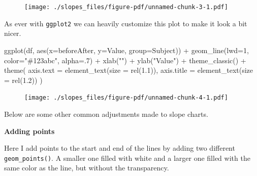 \documentclass[
  letterpaper,
  DIV=11,
  numbers=noendperiod]{scrreprt}
\newenvironment{Shaded}{\begin{snugshade}}{\end{snugshade}}
\newcommand{\AttributeTok}[1]{\textcolor[rgb]{0.40,0.45,0.13}{#1}}
\newcommand{\DecValTok}[1]{\textcolor[rgb]{0.68,0.00,0.00}{#1}}
\newcommand{\FloatTok}[1]{\textcolor[rgb]{0.68,0.00,0.00}{#1}}
\newcommand{\FunctionTok}[1]{\textcolor[rgb]{0.28,0.35,0.67}{#1}}
\newcommand{\NormalTok}[1]{\textcolor[rgb]{0.00,0.23,0.31}{#1}}
\newcommand{\SpecialCharTok}[1]{\textcolor[rgb]{0.37,0.37,0.37}{#1}}
\newcommand{\StringTok}[1]{\textcolor[rgb]{0.13,0.47,0.30}{#1}}
\begin{document}
\begin{figure}[H]

{\centering \texttt{[image: ./slopes\_files/figure-pdf/unnamed-chunk-3-1.pdf]}

}

\end{figure}

As ever with \texttt{ggplot2} we can heavily customize this plot to make
it look a bit nicer.

\begin{Shaded}
\begin{Highlighting}[]
\FunctionTok{ggplot}\NormalTok{(df, }\FunctionTok{aes}\NormalTok{(}\AttributeTok{x=}\NormalTok{beforeAfter, }\AttributeTok{y=}\NormalTok{Value, }\AttributeTok{group=}\NormalTok{Subject)) }\SpecialCharTok{+}
  \FunctionTok{geom\_line}\NormalTok{(}\AttributeTok{lwd=}\DecValTok{1}\NormalTok{, }\AttributeTok{color=}\StringTok{"\#123abc"}\NormalTok{, }\AttributeTok{alpha=}\NormalTok{.}\DecValTok{7}\NormalTok{) }\SpecialCharTok{+}
  \FunctionTok{xlab}\NormalTok{(}\StringTok{""}\NormalTok{) }\SpecialCharTok{+}
  \FunctionTok{ylab}\NormalTok{(}\StringTok{"Value"}\NormalTok{) }\SpecialCharTok{+}
  \FunctionTok{theme\_classic}\NormalTok{() }\SpecialCharTok{+}
  \FunctionTok{theme}\NormalTok{(}
    \AttributeTok{axis.text =} \FunctionTok{element\_text}\NormalTok{(}\AttributeTok{size =} \FunctionTok{rel}\NormalTok{(}\FloatTok{1.1}\NormalTok{)),}
    \AttributeTok{axis.title =} \FunctionTok{element\_text}\NormalTok{(}\AttributeTok{size =} \FunctionTok{rel}\NormalTok{(}\FloatTok{1.2}\NormalTok{))}
\NormalTok{  ) }
\end{Highlighting}
\end{Shaded}

\begin{figure}[H]

{\centering \texttt{[image: ./slopes\_files/figure-pdf/unnamed-chunk-4-1.pdf]}

}

\end{figure}

Below are some other common adjustments made to slope charts.

\textbf{Adding points}

Here I add points to the start and end of the lines by adding two
different \texttt{geom\_points()}. A smaller one filled with white and a
larger one filled with the same color as the line, but without the
transparency.
\end{document}
